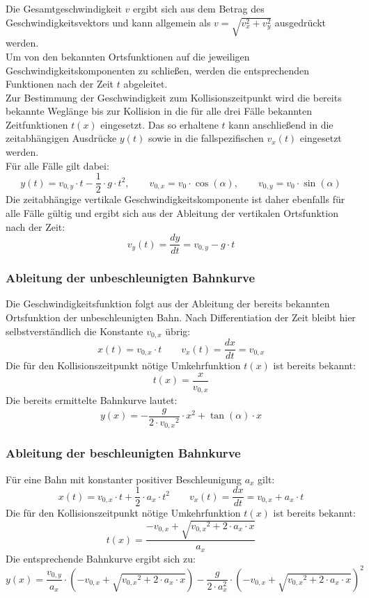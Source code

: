 Die Gesamtgeschwindigkeit $v$ ergibt sich aus dem Betrag des Geschwindigkeitsvektors und kann allgemein als $v = \sqrt{v_x^2 + v_y^2}$ ausgedrückt werden.
\\
Um von den bekannten Ortsfunktionen auf die jeweiligen Geschwindigkeitskomponenten zu schließen, werden die entsprechenden Funktionen nach der Zeit $t$ abgeleitet.
\\
Zur Bestimmung der Geschwindigkeit zum Kollisionszeitpunkt wird die bereits bekannte Weglänge bis zur Kollision in die für alle drei Fälle bekannten Zeitfunktionen $t(x)$ eingesetzt. Das so erhaltene $t$ kann anschließend in die zeitabhängigen Ausdrücke $y(t)$ sowie in die fallspezifischen $v_x(t)$ eingesetzt werden.\\
Für alle Fälle gilt dabei:
\[
y(t) = v_{0,y} \cdot t - \frac{1}{2} \cdot g \cdot t^2,
\qquad
v_{0,x} = v_0 \cdot \cos(\alpha),
\qquad
v_{0,y} = v_0 \cdot \sin(\alpha)
\]
Die zeitabhängige vertikale Geschwindigkeitskomponente ist daher ebenfalls für alle Fälle gültig und ergibt sich aus der Ableitung der vertikalen Ortsfunktion nach der Zeit:
\[
v_y(t) = \frac{dy}{dt} = v_{0,y} - g \cdot t
\]
\subsubsection{Ableitung der unbeschleunigten Bahnkurve}

Die Geschwindigkeitsfunktion folgt aus der Ableitung der bereits bekannten Ortsfunktion der unbeschleunigten Bahn. Nach Differentiation der Zeit bleibt hier selbstverständlich die Konstante $v_{0,x}$ übrig:
\[
x(t) = v_{0,x} \cdot t \qquad v_x(t) = \frac{dx}{dt} = v_{0,x}
\]
Die für den Kollisionszeitpunkt nötige Umkehrfunktion $t(x)$ ist bereits bekannt:
\[
t(x) = \frac{x}{v_{0,x}}
\]
Die bereits ermittelte Bahnkurve lautet:
\[
y(x) = -\frac{g}{2 \cdot {v_{0,x}}^{2}} \cdot x^{2} + \tan(\alpha) \cdot x
\]

\subsubsection{Ableitung der beschleunigten Bahnkurve}

Für eine Bahn mit konstanter positiver Beschleunigung $a_x$ gilt:
\[
x(t) = v_{0,x} \cdot t + \frac{1}{2} \cdot a_x \cdot t^2 \qquad v_x(t) = \frac{dx}{dt} = v_{0,x} + a_x \cdot t
\]
Die für den Kollisionszeitpunkt nötige Umkehrfunktion $t(x)$ ist bereits bekannt:
\[
t(x) = \frac{-v_{0,x} + \sqrt{{v_{0,x}}^2 + 2 \cdot a_x \cdot x}}{a_x}
\]
Die entsprechende Bahnkurve ergibt sich zu:
\[
y(x) = \frac{v_{0,y}}{a_x} \cdot \left(-v_{0,x} + \sqrt{{v_{0,x}}^2 + 2 \cdot a_x \cdot x}\right)
- \frac{g}{2 \cdot a_x^2} \cdot \left(-v_{0,x} + \sqrt{{v_{0,x}}^2 + 2 \cdot a_x \cdot x}\right)^2
\]

